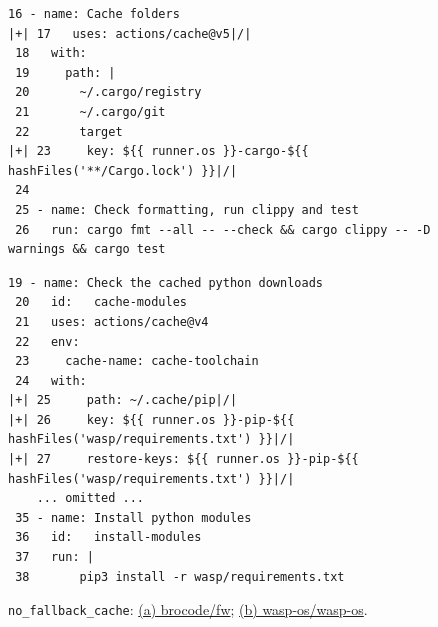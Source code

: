 \begin{figure}[htbp]
\centering
\begin{lstlisting}[style=ccscase,aboveskip=2pt,belowskip=3pt]
 16 - name: Cache folders
|+| 17   uses: actions/cache@v5|/|
 18   with:
 19     path: |
 20       ~/.cargo/registry
 21       ~/.cargo/git
 22       target
|+| 23     key: ${{ runner.os }}-cargo-${{ hashFiles('**/Cargo.lock') }}|/|
 24 
 25 - name: Check formatting, run clippy and test
 26   run: cargo fmt --all -- --check && cargo clippy -- -D warnings && cargo test
\end{lstlisting}
\par{}
\begin{lstlisting}[style=ccscase,aboveskip=2pt,belowskip=3pt]
 19 - name: Check the cached python downloads
 20   id:   cache-modules
 21   uses: actions/cache@v4
 22   env:
 23     cache-name: cache-toolchain
 24   with:
|+| 25     path: ~/.cache/pip|/|
|+| 26     key: ${{ runner.os }}-pip-${{ hashFiles('wasp/requirements.txt') }}|/|
|+| 27     restore-keys: ${{ runner.os }}-pip-${{ hashFiles('wasp/requirements.txt') }}|/|
    ... omitted ...
 35 - name: Install python modules
 36   id:   install-modules
 37   run: |
 38       pip3 install -r wasp/requirements.txt
\end{lstlisting}
\par{}
\caption{\texttt{no\_fallback\_cache}: \href{https://github.com/brocode/fw/blob/b01e51fa316d58d468d95e4bf0394d48bb35091e/.github/workflows/rust.yml}{(a) brocode/fw}; \href{https://github.com/wasp-os/wasp-os/blob/14cc0353b2eb9a3690fa23b265df04cb344a0e5c/.github/workflows/sim.yml}{(b) wasp-os/wasp-os}.}
\label{fig:ccs-fallback-code}
\end{figure}
